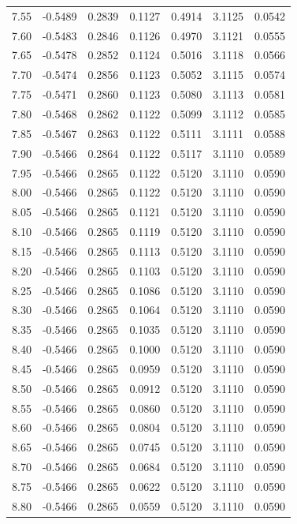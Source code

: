 \begin{longtable}{|c|c|c|c|c|c|c|}
7.55 & -0.5489 & 0.2839 & 0.1127 & 0.4914 & 3.1125 & 0.0542 \\
7.60 & -0.5483 & 0.2846 & 0.1126 & 0.4970 & 3.1121 & 0.0555 \\
7.65 & -0.5478 & 0.2852 & 0.1124 & 0.5016 & 3.1118 & 0.0566 \\
7.70 & -0.5474 & 0.2856 & 0.1123 & 0.5052 & 3.1115 & 0.0574 \\
7.75 & -0.5471 & 0.2860 & 0.1123 & 0.5080 & 3.1113 & 0.0581 \\
7.80 & -0.5468 & 0.2862 & 0.1122 & 0.5099 & 3.1112 & 0.0585 \\
7.85 & -0.5467 & 0.2863 & 0.1122 & 0.5111 & 3.1111 & 0.0588 \\
7.90 & -0.5466 & 0.2864 & 0.1122 & 0.5117 & 3.1110 & 0.0589 \\
7.95 & -0.5466 & 0.2865 & 0.1122 & 0.5120 & 3.1110 & 0.0590 \\
8.00 & -0.5466 & 0.2865 & 0.1122 & 0.5120 & 3.1110 & 0.0590 \\
8.05 & -0.5466 & 0.2865 & 0.1121 & 0.5120 & 3.1110 & 0.0590 \\
8.10 & -0.5466 & 0.2865 & 0.1119 & 0.5120 & 3.1110 & 0.0590 \\
8.15 & -0.5466 & 0.2865 & 0.1113 & 0.5120 & 3.1110 & 0.0590 \\
8.20 & -0.5466 & 0.2865 & 0.1103 & 0.5120 & 3.1110 & 0.0590 \\
8.25 & -0.5466 & 0.2865 & 0.1086 & 0.5120 & 3.1110 & 0.0590 \\
8.30 & -0.5466 & 0.2865 & 0.1064 & 0.5120 & 3.1110 & 0.0590 \\
8.35 & -0.5466 & 0.2865 & 0.1035 & 0.5120 & 3.1110 & 0.0590 \\
8.40 & -0.5466 & 0.2865 & 0.1000 & 0.5120 & 3.1110 & 0.0590 \\
8.45 & -0.5466 & 0.2865 & 0.0959 & 0.5120 & 3.1110 & 0.0590 \\
8.50 & -0.5466 & 0.2865 & 0.0912 & 0.5120 & 3.1110 & 0.0590 \\
8.55 & -0.5466 & 0.2865 & 0.0860 & 0.5120 & 3.1110 & 0.0590 \\
8.60 & -0.5466 & 0.2865 & 0.0804 & 0.5120 & 3.1110 & 0.0590 \\
8.65 & -0.5466 & 0.2865 & 0.0745 & 0.5120 & 3.1110 & 0.0590 \\
8.70 & -0.5466 & 0.2865 & 0.0684 & 0.5120 & 3.1110 & 0.0590 \\
8.75 & -0.5466 & 0.2865 & 0.0622 & 0.5120 & 3.1110 & 0.0590 \\
8.80 & -0.5466 & 0.2865 & 0.0559 & 0.5120 & 3.1110 & 0.0590 \\

\end{longtable}
